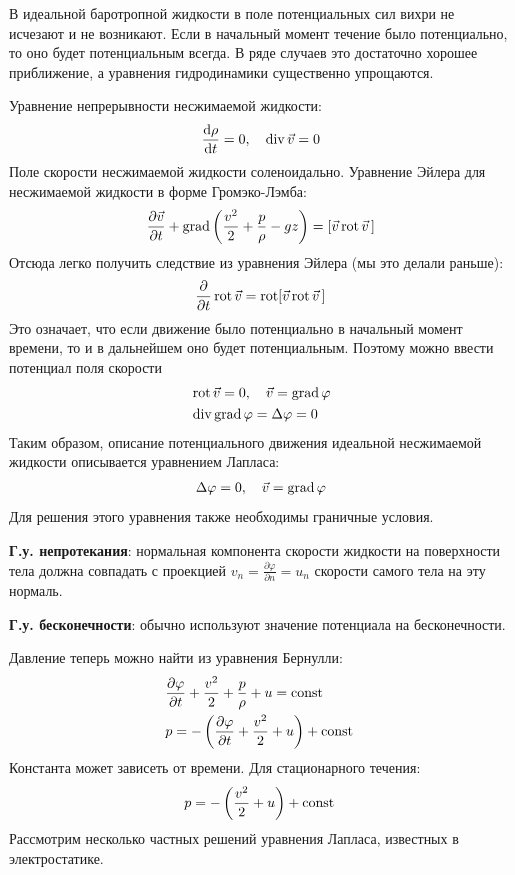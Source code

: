 В идеальной баротропной жидкости в поле потенциальных сил вихри не исчезают и не возникают. Если в начальный момент течение было потенциально, то оно будет потенциальным всегда. В ряде случаев это достаточно хорошее приближение, а уравнения гидродинамики существенно упрощаются. 

Уравнение непрерывности несжимаемой жидкости:
\begin{align*}
\frac { \dd \rho } { \dd t } = 0 ,\quad \operatorname{div} \vec{v} = 0
\end{align*}
Поле скорости несжимаемой жидкости соленоидально. Уравнение Эйлера для несжимаемой жидкости в форме Громэко-Лэмба:
\begin{align*}
\pdv{\vec{v}}{t} + \operatorname{grad}\qty(\frac{v^2}{2}+\frac{p}{\rho}-gz) = [\vec{v} \operatorname{rot}\vec{v}\,]
\end{align*}
Отсюда легко получить следствие из уравнения Эйлера (мы это делали раньше):
\begin{align*}
\pdv{t}\operatorname{rot}\vec{v} =\operatorname{rot}[ \vec{v}\operatorname{rot}\vec{v}  \, ]
\end{align*}
Это означает, что если движение было потенциально в начальный момент времени, то и в дальнейшем оно будет потенциальным. Поэтому можно ввести потенциал поля скорости
\begin{align*}
 &\operatorname{rot} \vec{v} = 0 , \quad  { \vec{v} =\operatorname{grad}\varphi } \\  
 &\operatorname { div\, grad } \varphi = \Delta \varphi = 0 
\end{align*}
Таким образом, описание потенциального движения идеальной несжимаемой жидкости описывается уравнением Лапласа:
\begin{align*}
\Delta \varphi = 0 , \quad \vec{v} =\operatorname{grad} \varphi
\end{align*}
Для решения этого уравнения также необходимы граничные условия.

\textbf{Г.у. непротекания}: нормальная компонента скорости жидкости на поверхности тела должна совпадать с проекцией $v_n=\frac { \partial \varphi } { \partial n }=u_n$ скорости самого тела на эту нормаль. 

\textbf{Г.у. бесконечности}: обычно используют значение потенциала на бесконечности.

Давление теперь можно найти из уравнения Бернулли:
\begin{align*}
& \frac { \partial \varphi } { \partial t } + \frac { v ^ { 2 } } { 2 } + \frac { p } { \rho } + u =  \mathrm{const}\,  \\
& p = - \left( \frac { \partial \varphi } { \partial t } + \frac { v ^ { 2 } } { 2 } + u \right) +  \mathrm{const}\, 
\end{align*}
Константа может зависеть от времени. Для стационарного течения:
\begin{align*}
p = - \left( \frac { v ^ { 2 } } { 2 } + u \right) +  \mathrm{const}\, 
\end{align*}
Рассмотрим несколько частных решений уравнения Лапласа, известных в  электростатике.

